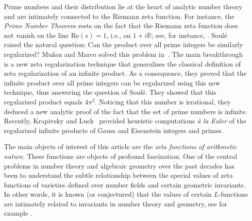 \documentclass[12pt]{amsart}
\begin{document}
Prime numbers and their distribution lie at the heart of analytic number theory and are intimately connected to the Riemann zeta function. For instance, the \emph{Prime Number Theorem} rests on the fact that the Riemann zeta function does not vanish on the line $\mathrm{Re}(s) = 1$, i.e., on $1 + i\mathbb{R}$; see, for instance, \cite{Titchmarsh}.
Soul\'e~\cite{Soule} raised the natural question: Can the product over all prime integers be similarly regularized? 
Mu\~{n}oz and Marco solved this problem in~\cite{Marco_prime}. 
The main breakthrough is a new zeta regularization technique that generalizes the classical definition of zeta regularization of an infinite product. 
As a consequence, they proved that the infinite product over all prime integers can be regularized using this new technique, thus answering the question of  Soul\'e. 
They showed that this regularized product equals $4\pi^2$. 
Noticing that this number is irrational, they deduced a new analytic proof of the fact that the set of prime numbers is infinite. Recently, Krapivsky and Luck~\cite{Luck} provided heuristic computations  \emph{\`a la Euler} of the regularized infinite products of Gauss and Eisenstein integers and primes.

\bigskip 



The main objects of interest of this article are the \emph{zeta functions of  {arithmetic}  nature}. 
These  functions are objects of profound fascination. 
One of the central problems in number theory and algebraic geometry over the past decades has been to understand the subtle relationship between the special values of zeta functions of varieties defined over number fields and certain geometric invariants. In other words, it is known (or conjectured) that the values of certain $L$-functions are intimately related to  invariants in number theory and  geometry,  see for example \cite{Geisser-2004, Morin-2018, Lichtenbaum-2005}. \\
\end{document}

